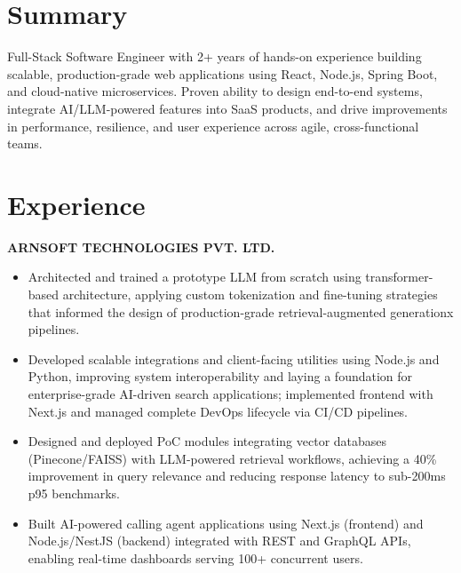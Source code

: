 \documentclass[letterpaper,10pt]{article}
\newcommand{\runsubsection}[1]{
  \color{subheadings}\fontsize{11pt}{13pt}\selectfont\bfseries\uppercase{#1}\normalfont
}
\newcommand{\descript}[1]{
  \color{subheadings}\raggedright\scshape\fontsize{10pt}{12pt}\selectfont{#1\\}\normalfont
}
\newcommand{\location}[1]{
  \color{headings}\raggedright\fontsize{9pt}{11pt}\selectfont{#1\\}\normalfont
}
\newenvironment{tightitemize}{
  \vspace{2pt}\begin{itemize}[leftmargin=12pt]\itemsep1pt \parskip0pt \parsep0pt
}{
  \end{itemize}\vspace{-\topsep}
}
\newcommand{\sectionsep}{\vspace{6pt}}
\begin{document}
\begin{minipage}[t]{0.66\textwidth}


\section{Summary}
\small{Full-Stack Software Engineer with 2+ years of hands-on experience building scalable, production-grade web applications using React, Node.js, Spring Boot, and cloud-native microservices. Proven ability to design end-to-end systems, integrate AI/LLM-powered features into SaaS products, and drive improvements in performance, resilience, and user experience across agile, cross-functional teams.}
\sectionsep



\section{Experience}


\runsubsection{Arnsoft Technologies Pvt. Ltd.}
\descript{| Software Developer}
\location{2025-05 -- Present | Hyderabad, Telangana}
\begin{tightitemize}

\item Architected and trained a prototype LLM from scratch using transformer-based architecture, applying custom tokenization and fine-tuning strategies that informed the design of production-grade retrieval-augmented generationx pipelines.

\item Developed scalable integrations and client-facing utilities using Node.js and Python, improving system interoperability and laying a foundation for enterprise-grade AI-driven search applications; implemented frontend with Next.js and managed complete DevOps lifecycle via CI/CD pipelines.

\item Designed and deployed PoC modules integrating vector databases (Pinecone/FAISS) with LLM-powered retrieval workflows, achieving a 40\% improvement in query relevance and reducing response latency to sub-200ms p95 benchmarks.

\item Built AI-powered calling agent applications using Next.js (frontend) and Node.js/NestJS (backend) integrated with REST and GraphQL APIs, enabling real-time dashboards serving 100+ concurrent users.


\end{tightitemize}
\end{minipage}
\end{document}
